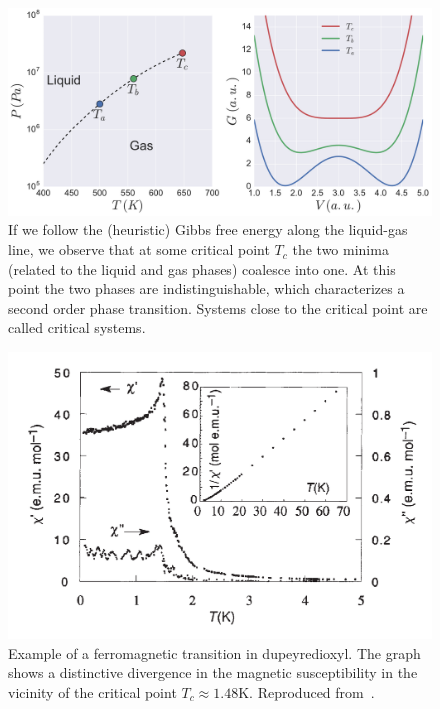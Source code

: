 \begin{figure}[h]
\begin{center}
    \includegraphics[scale=0.4]{chapters/ch2-crit/figs/gibbs2}
\end{center}
\caption{If we follow the (heuristic) Gibbs free energy along the liquid-gas
    line, we observe that at some critical point $T_c$ the two minima (related
    to the liquid and gas phases) coalesce into one. At this point the two
    phases are indistinguishable, which characterizes a second order phase
    transition. Systems close to the critical point are called critical
    systems.}
\label{fig:gibbs2}
\end{figure}


\begin{figure}[h]
\begin{center}
    \includegraphics[scale=0.6]{chapters/ch2-crit/figs/suscep}
\end{center}
\caption{Example of a ferromagnetic transition in dupeyredioxyl. The graph
    shows a distinctive divergence in the magnetic susceptibility in the
    vicinity of the critical point $T_c\approx1.48$K. Reproduced
    from~\cite{Chiarelli1993}.}
\label{fig:suscep}
\end{figure}

